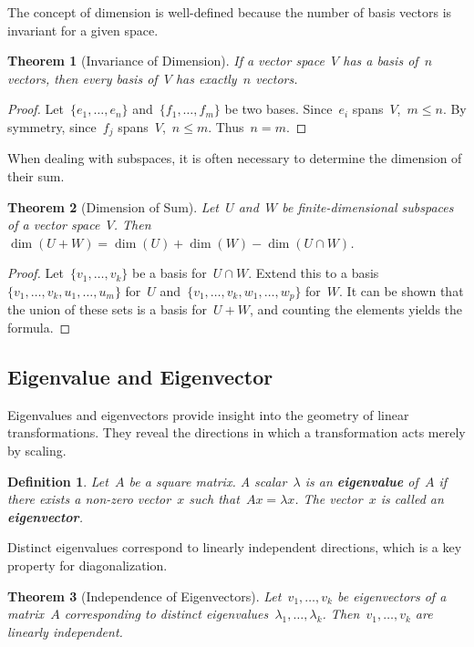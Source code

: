 \documentclass[12pt]{article}
\newtheorem{theorem}{Theorem}[section]
\newtheorem{definition}{Definition}[section]
\begin{document}
The concept of dimension is well-defined because the number of basis vectors is invariant for a given space.

\begin{theorem}[Invariance of Dimension]
    If a vector space~$V$ has a basis of~$n$ vectors, then every basis of~$V$ has exactly~$n$ vectors.
\end{theorem}

\begin{proof}
    Let~$\{e_1, \dots, e_n\}$ and~$\{f_1, \dots, f_m\}$ be two bases. Since~$e_i$ spans~$V$,~$m \le n$. By symmetry, since~$f_j$ spans~$V$,~$n \le m$. Thus~$n=m$.
\end{proof}

When dealing with subspaces, it is often necessary to determine the dimension of their sum.

\begin{theorem}[Dimension of Sum]
    Let~$U$ and~$W$ be finite-dimensional subspaces of a vector space~$V$. Then~$\dim(U+W) = \dim(U) + \dim(W) - \dim(U \cap W)$.
\end{theorem}

\begin{proof}
    Let~$\{v_1, \dots, v_k\}$ be a basis for~$U \cap W$. Extend this to a basis~$\{v_1, \dots, v_k, u_1, \dots, u_m\}$ for~$U$ and~$\{v_1, \dots, v_k, w_1, \dots, w_p\}$ for~$W$. It can be shown that the union of these sets is a basis for~$U+W$, and counting the elements yields the formula.
\end{proof}

\subsection{Eigenvalue and Eigenvector}

Eigenvalues and eigenvectors provide insight into the geometry of linear transformations. They reveal the directions in which a transformation acts merely by scaling.

\begin{definition}
    Let~$A$ be a square matrix. A scalar~$\lambda$ is an \textbf{eigenvalue} of~$A$ if there exists a non-zero vector~$x$ such that~$Ax = \lambda x$. The vector~$x$ is called an \textbf{eigenvector}.
\end{definition}

Distinct eigenvalues correspond to linearly independent directions, which is a key property for diagonalization.

\begin{theorem}[Independence of Eigenvectors]
    Let~$v_1, \dots, v_k$ be eigenvectors of a matrix~$A$ corresponding to distinct eigenvalues~$\lambda_1, \dots, \lambda_k$. Then~$v_1, \dots, v_k$ are linearly independent.
\end{theorem}
\end{document}
